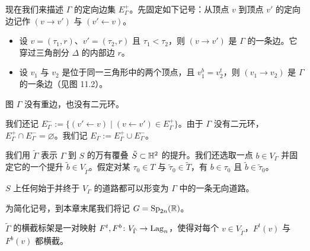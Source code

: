 现在我们来描述 $\Gamma$ 的定向边集 $E_\Gamma^{+}$。先固定如下记号：从顶点 $v$ 到顶点 $v'$ 的定向边记作 $(v\to v')$ 与 $(v'\leftarrow v)$。

\begin{itemize}
\item 设 $v=(\tau_1,r)$、$v'=(\tau_2,r)$ 且 $\tau_1<\tau_2$，则 $(v\to v')$ 是 $\Gamma$ 的一条边。它穿过三角剖分 $\Delta$ 的内部边 $r$。
\item 设 $v_1$ 与 $v_2$ 是位于同一三角形中的两个顶点，且 $v_1^{b}=v_2^{t}$，则 $(v_1\to v_2)$ 是 $\Gamma$ 的一条边（见图 11.2）。
\end{itemize}

\begin{remark}[11.28]
图 $\Gamma$ 没有重边，也没有二元环。
\end{remark}




我们还记 $E_\Gamma^{-}:=\{(v'\leftarrow v)\mid (v\leftarrow v')\in E_\Gamma^{+}\}$。由于 $\Gamma$ 没有二元环，$E_\Gamma^{+}\cap E_\Gamma^{-}=\varnothing$。我们记 $E_\Gamma:=E_\Gamma^{+}\cup E_\Gamma^{-}$。

我们用 $\tilde\Gamma$ 表示 $\Gamma$ 到 $S$ 的万有覆叠 $\tilde S\subset\mathbb{H}^{2}$ 的提升。我们还选取一点 $b\in V_\Gamma$ 并固定它的一个提升 $\tilde b\in V_{\tilde\Gamma}$。假定对某 $\tau_0\in T$ 与 $\tilde\tau_0\in\tilde T$，有 $b\in\tau_0$ 且 $\tilde b\in\tilde\tau_0$。

\begin{remark}[11.29]
$S$ 上任何始于并终于 $V_\Gamma$ 的道路都可以形变为 $\Gamma$ 中的一条无向道路。
\end{remark}

为简化记号，到本章末尾我们将记 $G=\operatorname{Sp}_{2n}(\mathbb{R})$。

\begin{definition}[11.30]
$\tilde\Gamma$ 的横截标架是一对映射 $F^{t},F^{b}\colon V_{\tilde\Gamma}\to\operatorname{Lag}_n$，使得对每个 $v\in V_{\tilde\Gamma}$，$F^{t}(v)$ 与 $F^{b}(v)$ 都横截。
\end{definition}

